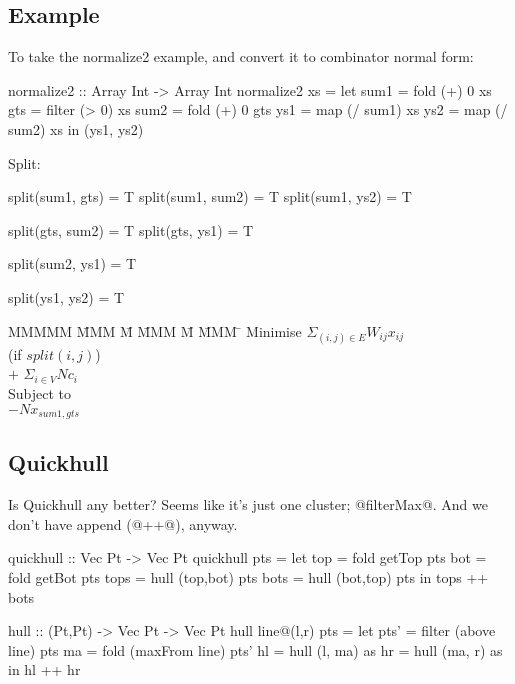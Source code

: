 \subsection{Example}
To take the normalize2 example, and convert it to combinator normal form:
\begin{code}
 normalize2 :: Array Int -> Array Int
 normalize2 xs
  = let sum1 = fold   (+)  0   xs
        gts  = filter (> 0)    xs
        sum2 = fold   (+)  0   gts
        ys1  = map    (/ sum1) xs
        ys2  = map    (/ sum2) xs
    in (ys1, ys2)
\end{code}

Split:
\begin{code}
split(sum1, gts)    = T
split(sum1, sum2)   = T
split(sum1, ys2)    = T

split(gts, sum2)    = T
split(gts, ys1)     = T

split(sum2, ys1)    = T

split(ys1, ys2)     = T
\end{code}

\begin{tabbing}
MMMMM   \= MMM \= M \= MMM \= M \= MMM \= \kill
Minimise   \>     \> $\Sigma_{(i,j) \in E} W_{ij} x_{ij}$   \\
           \> (if $split(i,j)$)         \\
           \> $+$ \> $\Sigma_{i \in V} N c_i$  \\
Subject to \\
    \> $-N x_{sum1, gts}$
\end{tabbing}



\subsection{Quickhull}
Is Quickhull any better? Seems like it's just one cluster; @filterMax@. And we don't have append (@++@), anyway.
\begin{code}
quickhull :: Vec Pt -> Vec Pt
quickhull pts
 = let top  = fold getTop pts
       bot  = fold getBot pts
       tops = hull (top,bot) pts
       bots = hull (bot,top) pts
   in  tops ++ bots

hull :: (Pt,Pt) -> Vec Pt -> Vec Pt
hull line@(l,r) pts
 = let pts' = filter (above   line) pts
       ma   = fold   (maxFrom line) pts'
       hl   = hull   (l, ma)        as
       hr   = hull   (ma, r)        as
   in  hl  ++ hr
\end{code}
